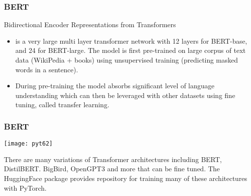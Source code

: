 \begin{frame}[fragile] \frametitle{BERT}

Bidirectional Encoder Representations from Transformers

\begin{itemize}
\item is a very large multi layer transformer network with 12 layers for BERT-base, and 24 for BERT-large. The model is first pre-trained on large corpus of text data (WikiPedia + books) using unsupervised training (predicting masked words in a sentence). 
\item During pre-training the model absorbs significant level of language understanding which can then be leveraged with other datasets using fine tuning, called transfer learning.
\end{itemize}

\end{frame}

\begin{frame}[fragile] \frametitle{BERT}

\begin{center}
\texttt{[image: pyt62]}
\end{center}

There are many variations of Transformer architectures including BERT, DistilBERT. BigBird, OpenGPT3 and more that can be fine tuned. The HuggingFace package provides repository for training many of these architectures with PyTorch.
\end{frame}
